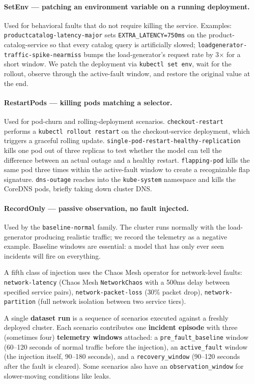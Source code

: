 \paragraph{SetEnv --- patching an environment variable on a running deployment.} Used for behavioral faults that do not require killing the service. Examples: \texttt{productcatalog-latency-major} sets \texttt{EXTRA\_LATENCY=750ms} on the product-catalog-service so that every catalog query is artificially slowed; \texttt{loadgenerator-traffic-spike-nearmiss} bumps the load-generator's request rate by 3$\times$ for a short window. We patch the deployment via \texttt{kubectl set env}, wait for the rollout, observe through the active-fault window, and restore the original value at the end.

\paragraph{RestartPods --- killing pods matching a selector.} Used for pod-churn and rolling-deployment scenarios. \texttt{checkout-restart} performs a \texttt{kubectl rollout restart} on the checkout-service deployment, which triggers a graceful rolling update. \texttt{single-pod-restart-healthy-replication} kills one pod out of three replicas to test whether the model can tell the difference between an actual outage and a healthy restart. \texttt{flapping-pod} kills the same pod three times within the active-fault window to create a recognizable flap signature. \texttt{dns-outage} reaches into the \texttt{kube-system} namespace and kills the CoreDNS pods, briefly taking down cluster DNS.

\paragraph{RecordOnly --- passive observation, no fault injected.} Used by the \texttt{baseline-normal} family. The cluster runs normally with the load-generator producing realistic traffic; we record the telemetry as a negative example. Baseline windows are essential: a model that has only ever seen incidents will fire on everything.

A fifth class of injection uses the Chaos Mesh operator for network-level faults: \texttt{network-latency} (Chaos Mesh \texttt{NetworkChaos} with a 500ms delay between specified service pairs), \texttt{network-packet-loss} (30\% packet drop), \texttt{network-partition} (full network isolation between two service tiers).

A single \textbf{dataset run} is a sequence of scenarios executed against a freshly deployed cluster. Each scenario contributes one \textbf{incident episode} with three (sometimes four) \textbf{telemetry windows} attached: a \texttt{pre\_fault\_baseline} window (60--120 seconds of normal traffic before the injection), an \texttt{active\_fault} window (the injection itself, 90--180 seconds), and a \texttt{recovery\_window} (90--120 seconds after the fault is cleared). Some scenarios also have an \texttt{observation\_window} for slower-moving conditions like leaks.

